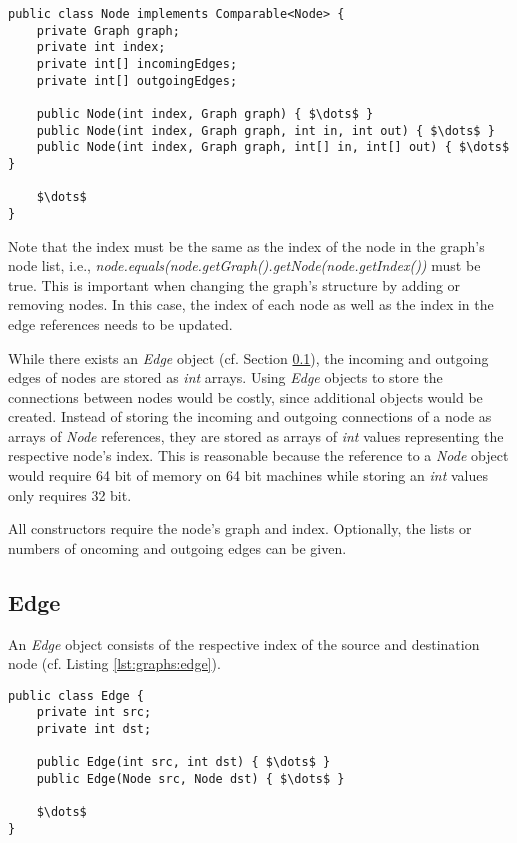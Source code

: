 \begin{lstlisting}[label={lst:graphs:node},caption={Instance variables and constructors of the \emph{Node} object}]
public class Node implements Comparable<Node> {
	private Graph graph;
	private int index;
	private int[] incomingEdges;
	private int[] outgoingEdges;
	
	public Node(int index, Graph graph) { $\dots$ }
	public Node(int index, Graph graph, int in, int out) { $\dots$ }
	public Node(int index, Graph graph, int[] in, int[] out) { $\dots$ }
	
	$\dots$
}
\end{lstlisting}

Note that the index must be the same as the index of the node in the graph's node list, i.e., \emph{node.equals(node.getGraph().getNode(node.getIndex())} must be true.
This is important when changing the graph's structure by adding or removing nodes.
In this case, the index of each node as well as the index in the edge references needs to be updated.

While there exists an \emph{Edge} object (cf. Section \ref{sec:graphs:edge}), the incoming and outgoing edges of nodes are stored as \emph{int} arrays.
Using \emph{Edge} objects to store the connections between nodes would be costly, since additional objects would be created.
Instead of storing the incoming and outgoing connections of a node as arrays of \emph{Node} references, they are stored as arrays of \emph{int} values representing the respective node's index.
This is reasonable because the reference to a \emph{Node} object would require 64 bit of memory on 64 bit machines while storing an \emph{int} values only requires 32 bit.

All constructors require the node's graph and index. Optionally, the lists or numbers of oncoming and outgoing edges can be given.





\subsection{Edge}
\label{sec:graphs:edge}

An \emph{Edge} object consists of the respective index of the source and destination node (cf. Listing \ref{lst:graphs:edge}).

\begin{lstlisting}[label={lst:graphs:edge},caption={Instance variables and constructors of the \emph{Edge} object}]
public class Edge {
	private int src;
	private int dst;

	public Edge(int src, int dst) { $\dots$ }
	public Edge(Node src, Node dst) { $\dots$ }
	
	$\dots$
}
\end{lstlisting}

